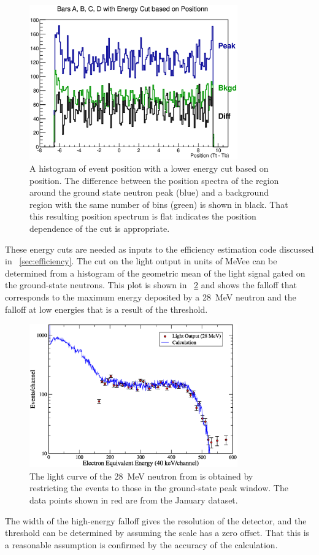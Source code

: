 \begin{figure}[!htbp]
\centering
\includegraphics[width=0.8\textwidth]{figures/PositionSpectrum.eps}
\caption{A histogram of event position with a lower energy cut based on position.  The difference between the position spectra of the region around the ground state neutron peak (blue) and a background region with the same number of bins (green) is shown in black.  That this resulting position spectrum is flat indicates the position dependence of the cut is appropriate.}
\label{fig:flatPositionSpectrum}
\end{figure}

These energy cuts are needed as inputs to the efficiency estimation code discussed in {\sect}~\ref{sec:efficiency}.  The cut on the light output in units of MeVee can be determined from a histogram of the geometric mean of the light signal gated on the ground-state neutrons.  This plot is shown in {\fig}~\ref{fig:lowEnergyCut} and shows the falloff that corresponds to the maximum energy deposited by a 28~MeV neutron and the falloff at low energies that is a result of the threshold.  
\begin{figure}[!htbp]
\centering
\includegraphics[width=0.8\textwidth]{figures/Lite_28MeV.eps}
\caption{The light curve of the 28~MeV neutron from \MgReaction is obtained by restricting the events to those in the ground-state peak window.  The data points shown in red are from the January dataset.}
\label{fig:lowEnergyCut}
\end{figure}
The width of the high-energy falloff gives the resolution of the detector, and the threshold can be determined by assuming the scale has a zero offset.  That this is a reasonable assumption is confirmed by the accuracy of the calculation.  

